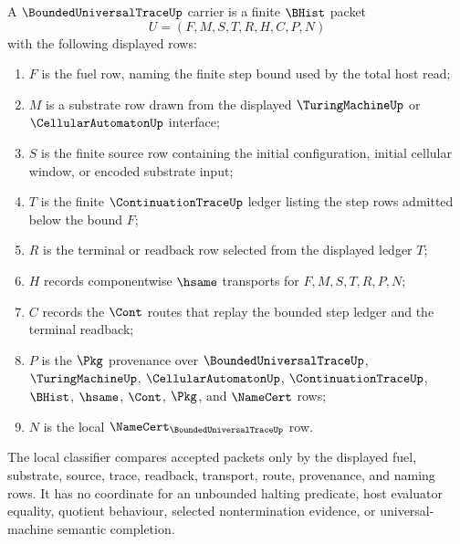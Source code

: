 \begin{definition}
\label{def:bounded-universal-trace-carrier}
A $\BoundedUniversalTraceUp$ carrier is a finite $\BHist$ packet
$$
U=(F,M,S,T,R,H,C,P,N)
$$
with the following displayed rows:
\begin{enumerate}
\item $F$ is the fuel row, naming the finite step bound used by the total host read;
\item $M$ is a substrate row drawn from the displayed $\TuringMachineUp$ or $\CellularAutomatonUp$ interface;
\item $S$ is the finite source row containing the initial configuration, initial cellular window, or encoded substrate input;
\item $T$ is the finite $\ContinuationTraceUp$ ledger listing the step rows admitted below the bound $F$;
\item $R$ is the terminal or readback row selected from the displayed ledger $T$;
\item $H$ records componentwise $\hsame$ transports for $F,M,S,T,R,P,N$;
\item $C$ records the $\Cont$ routes that replay the bounded step ledger and the terminal readback;
\item $P$ is the $\Pkg$ provenance over $\BoundedUniversalTraceUp$, $\TuringMachineUp$, $\CellularAutomatonUp$, $\ContinuationTraceUp$, $\BHist$, $\hsame$, $\Cont$, $\Pkg$, and $\NameCert$ rows;
\item $N$ is the local $\NameCert_{\BoundedUniversalTraceUp}$ row.
\end{enumerate}
The local classifier compares accepted packets only by the displayed fuel, substrate, source, trace, readback, transport, route, provenance, and naming rows. It has no coordinate for an unbounded halting predicate, host evaluator equality, quotient behaviour, selected nontermination evidence, or universal-machine semantic completion.
\end{definition}

